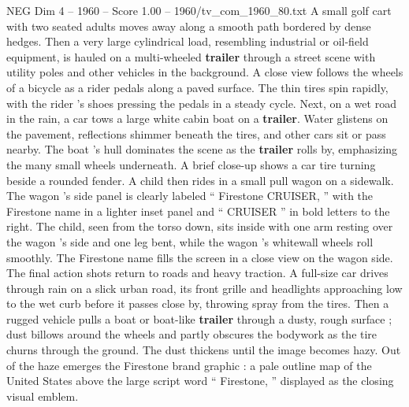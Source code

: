 \begin{textsample}{NEG Dim 4 – 1960 – Score 1.00 – 1960/tv\_com\_1960\_80.txt}
A small golf cart with two seated adults moves away along a smooth path bordered by dense hedges.
Then a very large cylindrical load, resembling industrial or oil-field equipment, is hauled on a multi-wheeled \textbf{trailer} through a street scene with utility poles and other vehicles in the background.
A close view follows the wheels of a bicycle as a rider pedals along a paved surface.
The thin tires spin rapidly, with the rider ’s shoes pressing the pedals in a steady cycle.
Next, on a wet road in the rain, a car tows a large white cabin boat on a \textbf{trailer}.
Water glistens on the pavement, reflections shimmer beneath the tires, and other cars sit or pass nearby.
The boat ’s hull dominates the scene as the \textbf{trailer} rolls by, emphasizing the many small wheels underneath.
A brief close-up shows a car tire turning beside a rounded fender.
A child then rides in a small pull wagon on a sidewalk.
The wagon ’s side panel is clearly labeled “ Firestone CRUISER, ” with the Firestone name in a lighter inset panel and “ CRUISER ” in bold letters to the right.
The child, seen from the torso down, sits inside with one arm resting over the wagon ’s side and one leg bent, while the wagon ’s whitewall wheels roll smoothly.
The Firestone name fills the screen in a close view on the wagon side.
The final action shots return to roads and heavy traction.
A full-size car drives through rain on a slick urban road, its front grille and headlights approaching low to the wet curb before it passes close by, throwing spray from the tires.
Then a rugged vehicle pulls a boat or boat-like \textbf{trailer} through a dusty, rough surface ; dust billows around the wheels and partly obscures the bodywork as the tire churns through the ground.
The dust thickens until the image becomes hazy.
Out of the haze emerges the Firestone brand graphic : a pale outline map of the United States above the large script word “ Firestone, ” displayed as the closing visual emblem.

\end{textsample}
